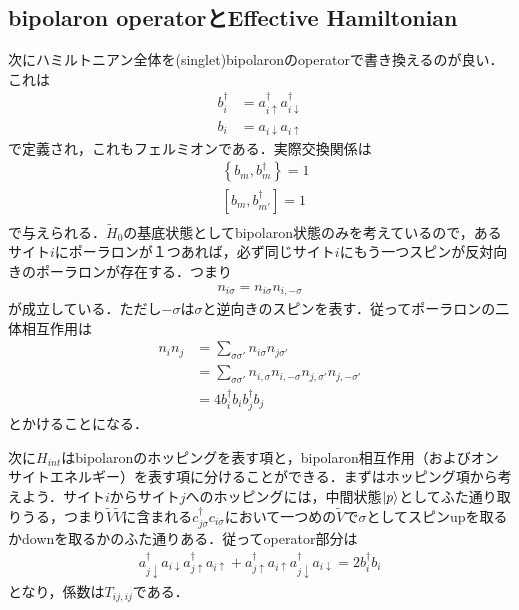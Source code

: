 \documentclass[a4j]{jarticle}
\begin{document}
\subsection{bipolaron operatorとEffective Hamiltonian}
次にハミルトニアン全体を(singlet)bipolaronのoperatorで書き換えるのが良い．これは
\begin{align}
 b^{\dagger}_i&=a^{\dagger}_{i\uparrow}a^{\dagger}_{i\downarrow} \\
 b_i&=a_{i\downarrow}a_{i\uparrow} 
\end{align}
で定義され，これもフェルミオンである．実際交換関係は
\begin{align}
 &\left\{b_m,b^{\dagger}_m\right\}=1 \label{commute}\\
 &\left[b_m,b^{\dagger}_{m'}\right]=1 \\
\end{align}
で与えられる．$\tilde{H}_0$の基底状態としてbipolaron状態のみを考えているので，あるサイト$i$にポーラロンが１つあれば，必ず同じサイト$i$にもう一つスピンが反対向きのポーラロンが存在する．つまり
\begin{align}
 n_{i\sigma}=n_{i\sigma}n_{i,-\sigma}\label{bipolaron}
\end{align}
が成立している．ただし$-\sigma$は$\sigma$と逆向きのスピンを表す．従ってポーラロンの二体相互作用は
\begin{align}
 n_in_j&=\sum_{\sigma\sigma'}n_{i\sigma}n_{j\sigma'} \\
 &=\sum_{\sigma\sigma'}n_{i,\sigma}n_{i,-\sigma}n_{j,\sigma'}n_{j,-\sigma'} \\
 &=4b^{\dagger}_ib_ib^{\dagger}_jb_j
\end{align}
とかけることになる．

次に$H_{int}$はbipolaronのホッピングを表す項と，bipolaron相互作用（およびオンサイトエネルギー）を表す項に分けることができる．まずはホッピング項から考えよう．サイト$i$からサイト$j$へのホッピングには，中間状態$\ket{p}$としてふた通り取りうる，つまり$\tilde{V}\tilde{V}$に含まれる$c^{\dagger}_{j\sigma}c_{i\sigma}$において一つめの$\tilde{V}$で$\sigma$としてスピンupを取るかdownを取るかのふた通りある．従ってoperator部分は
\begin{align}
 a^{\dagger}_{j\downarrow}a_{i\downarrow} a^{\dagger}_{j\uparrow}a_{i\uparrow}+ a^{\dagger}_{j\uparrow}a_{i\uparrow} a^{\dagger}_{j\downarrow}a_{i\downarrow}=2b^{\dagger}_ib_i
\end{align}
となり，係数は$T_{ij,ij}$である．
\end{document}
